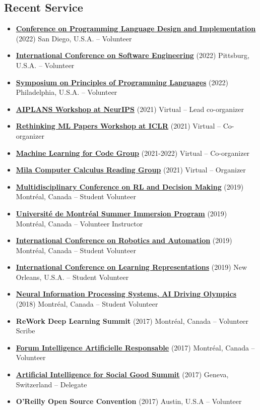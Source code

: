 \documentclass[letterpaper,11pt]{article}
\newcommand{\resumeItem}[2]{
  \item\small{\textbf{#1}{ #2 }}
}
\newcommand{\resumeSubItem}[2]{\resumeItem{#1}{#2}}
\newcommand{\resumeSubHeadingListStart}{\begin{itemize}[leftmargin=*]}
\newcommand{\resumeSubHeadingListEnd}{\end{itemize}}
\begin{document}
\begin{justify}
\section{Recent Service}
\resumeSubHeadingListStart
\resumeSubItem{\href{https://pldi22.sigplan.org/}{Conference on Programming Language Design and Implementation}}{(2022) San Diego, U.S.A. -- Volunteer}
\resumeSubItem{\href{https://conf.researchr.org/home/icse-2022}{International Conference on Software Engineering}}{(2022) Pittsburg, U.S.A. -- Volunteer}
\resumeSubItem{\href{https://popl22.sigplan.org/}{Symposium on Principles of Programming Languages}}{(2022) Philadelphia, U.S.A. -- Volunteer}
\resumeSubItem{\href{https://aiplans.github.io/}{AIPLANS Workshop at NeurIPS}}{(2021) Virtual -- Lead co-organizer}
\resumeSubItem{\href{https://rethinkingmlpapers.github.io/}{Rethinking ML Papers Workshop at ICLR}}{(2021) Virtual -- Co-organizer}
\resumeSubItem{\href{https://ml4code-mtl.github.io/}{Machine Learning for Code Group}}{(2021-2022) Virtual -- Co-organizer}
\resumeSubItem{\href{https://compcalc.github.io/}{Mila Computer Calculus Reading Group}}{(2021) Virtual -- Organizer}
\resumeSubItem{\href{http://rldm.org/}{Multidisciplinary Conference on RL and Decision Making}}{(2019) Montr\'eal, Canada -- Student Volunteer}
\resumeSubItem{\href{https://admission.umontreal.ca/en/summer-immersion-program/a-summer-in-montreal/}{Universit\'e de Montr\'eal Summer Immersion Program}}{(2019) Montr\'eal, Canada -- Volunteer Instructor}
\resumeSubItem{\href{https://www.icra2019.org/}{International Conference on Robotics and Automation}}{(2019)  Montr\'eal, Canada -- Student Volunteer}
\resumeSubItem{\href{https://iclr.cc/Conferences/2019}{International Conference on Learning Representations}}{(2019) New Orleans, U.S.A. -- Student Volunteer}
\resumeSubItem{\href{https://www.duckietown.org/research/ai-driving-olympics}{Neural Information Processing Systems, AI Driving Olympics}}{(2018) Montr\'eal, Canada -- Student Volunteer}
\resumeSubItem{ReWork Deep Learning Summit}{(2017) Montr\'eal, Canada -- Volunteer Scribe}
\resumeSubItem{\href{https://sites.grenadine.co/sites/forumiaresponsableumontreal/fr/forumiaresponsableumontreal}{Forum Intelligence Artificielle Responsable}}{(2017) Montr\'eal, Canada -- Volunteer}
\resumeSubItem{\href{https://aiforgood.itu.int/}{Artificial Intelligence for Social Good Summit}}{(2017) Geneva, Switzerland -- Delegate}
\resumeSubItem{O'Reilly Open Source Convention}{(2017) Austin, U.S.A -- Volunteer}
\resumeSubHeadingListEnd


\end{justify}
\end{document}
